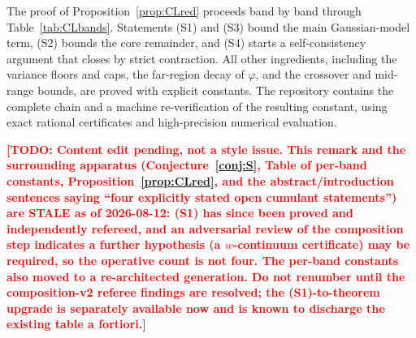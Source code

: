 \documentclass[11pt]{amsart}
\theoremstyle{plain}
\theoremstyle{definition}
\theoremstyle{remark}
\newcommand{\TODO}[1]{\textcolor{red}{\textbf{[TODO: #1]}}}
\begin{document}
The proof of Proposition~\ref{prop:CLred} proceeds band by band through
Table~\ref{tab:CLbands}. Statements (S1) and (S3) bound the main
Gaussian-model term, (S2) bounds the core remainder, and (S4) starts a
self-consistency argument that closes by strict contraction. All other
ingredients, including the variance floors and caps, the far-region decay
of $\varphi$, and the crossover and mid-range bounds, are proved with
explicit constants. The repository contains the complete chain and a
machine re-verification of the resulting constant, using exact rational
certificates and high-precision numerical evaluation.

\TODO{Content edit pending, not a style issue. This remark and the surrounding
apparatus (Conjecture~\ref{conj:S}, Table of per-band constants,
Proposition~\ref{prop:CLred}, and the abstract/introduction sentences saying
``four explicitly stated open cumulant statements'') are STALE as of 2026-08-12:
(S1) has since been proved and independently refereed, and an adversarial review of
the composition step indicates a further hypothesis (a $w$-continuum certificate)
may be required, so the operative count is not four. The per-band constants also
moved to a re-architected generation. Do not renumber until the composition-v2
referee findings are resolved; the (S1)-to-theorem upgrade is separately available
now and is known to discharge the existing table a fortiori.}
\end{document}
